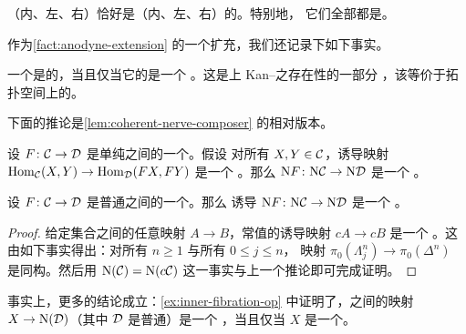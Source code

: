 \begin{corollary}\label{cor:anodyne-saturated-closure}
（内、左、右）\trAnodyneMap{}恰好是（内、左、右）\trHornInclusion{}的\trSaturation{}。特别地，
它们全部都是\trMonomorphism{}。
\end{corollary}

作为\cref{fact:anodyne-extension} 的一个扩充，我们还记录下如下事实。

\begin{fact}\label{fact:anodyne-iff-realization-we}
一个\trMonomorphism{}是\trAnodyne{}的，当且仅当它的\trGeometricRealization{}是一个%
\trWeakEquivalence{}。这是\trSimplicialSet{}上 Kan--\trQuillen{}\trModelStructure{}之存在性的一部分
\cite[Theorem 11.3]{GJ09}，该\trModelStructure{}等价于拓扑空间上的\trQuillen{}\trModelStructure{}。
\end{fact}

下面的推论是\cref{lem:coherent-nerve-composer} 的相对版本。

\begin{corollary}\label{cor:relative-nerve-inner-fibration}
设 $F\colon \mathcal{C} \to \mathcal{D}$ 是单纯\trCategories{}之间的一个\trMorphism{}。假设
对所有\trObject{} $X, Y \in \mathcal{C}$，诱导映射
$\mathrm{Hom}_{\mathcal{C}}(X, Y) \to \mathrm{Hom}_{\mathcal{D}}(FX, FY)$ 是一个%
\trKanFibration{}。那么
$\mathrm{N}F\colon \mathrm{N}\mathcal{C} \to \mathrm{N}\mathcal{D}$ 是一个%
\trInnerFibration{}。
\end{corollary}

\begin{corollary}\label{cor:nerve-functor-inner-fibration}
设 $F\colon \mathcal{C} \to \mathcal{D}$ 是普通\trCategories{}之间的一个\trFunctor{}。那么
诱导\trFunctor{} $\mathrm{N}F\colon \mathrm{N}\mathcal{C} \to \mathrm{N}\mathcal{D}$ 是一个%
\trInnerFibration{}。
\end{corollary}

\begin{proof}
给定集合之间的任意映射 $A \to B$，常值\trSimplicialSet{}的诱导映射 $cA \to cB$ 是一个%
\trKanFibration{}。这由如下事实得出：对所有 $n \ge 1$ 与所有 $0 \le j \le n$，
映射 $\pi_0(\Lambda^n_j) \to \pi_0(\Delta^n)$ 是同构。然后用
$\mathrm{N}(\mathcal{C}) = \mathrm{N}(c\mathcal{C})$ 这一事实与上一个推论即可完成证明。
\end{proof}

\begin{remark}\label{rem:inner-fibration-characterization}
事实上，更多的结论成立：\cref{ex:inner-fibration-op} 中证明了，\trSimplicialSet{}之间的映射
$X \to \mathrm{N}(\mathcal{D})$（其中 $\mathcal{D}$ 是普通\trCategory{}）是一个%
\trInnerFibration{}，当且仅当 $X$ 是一个\trInfinityCategory{}。
\end{remark}

